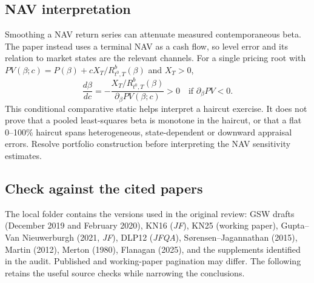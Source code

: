 \documentclass[11pt]{article}
\newcommand{\code}[1]{\texttt{\detokenize{#1}}}
\theoremstyle{plain}
\theoremstyle{definition}
\begin{document}
\subsection{NAV interpretation}
\label{sec:auditG}

Smoothing a NAV return series can attenuate measured contemporaneous beta. The paper instead uses a terminal NAV as a cash flow, so level error and its relation to market states are the relevant channels. For a single pricing root with $PV(\beta;c)=P(\beta)+cX_T/R^b_{t^0,T}(\beta)$ and $X_T>0$,
\[
\frac{d\beta}{dc}=-\frac{X_T/R^b_{t^0,T}(\beta)}{\partial_\beta PV(\beta;c)}>0
\quad\text{if }\partial_\beta PV<0.
\]
This conditional comparative static helps interpret a haircut exercise. It does not prove that a pooled least-squares beta is monotone in the haircut, or that a flat 0--100\% haircut spans heterogeneous, state-dependent or downward appraisal errors. Resolve portfolio construction before interpreting the NAV sensitivity estimates.

\subsection{Check against the cited papers}
\label{sec:sources}

The local \code{papers/} folder contains the versions used in the original review: GSW drafts (December 2019 and February 2020), KN16 (\emph{JF}), KN25 (working paper), Gupta--Van Nieuwerburgh (2021, \emph{JF}), DLP12 (\emph{JFQA}), S{\o}rensen--Jagannathan (2015), Martin (2012), Merton (1980), Flanagan (2025), and the supplements identified in the audit. Published and working-paper pagination may differ. The following retains the useful source checks while narrowing the conclusions.
\end{document}
